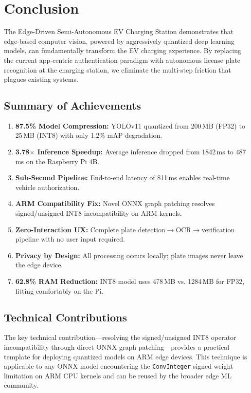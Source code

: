 \chapter{Conclusion}

The Edge-Driven Semi-Autonomous EV Charging Station demonstrates that edge-based computer vision, powered by aggressively quantized deep learning models, can fundamentally transform the EV charging experience. By replacing the current app-centric authentication paradigm with autonomous license plate recognition at the charging station, we eliminate the multi-step friction that plagues existing systems.

\section{Summary of Achievements}
\begin{enumerate}
    \item \textbf{87.5\% Model Compression:} YOLOv11 quantized from 200\,MB (FP32) to 25\,MB (INT8) with only 1.2\% mAP degradation.
    \item \textbf{3.78$\times$ Inference Speedup:} Average inference dropped from 1842\,ms to 487\,ms on the Raspberry Pi 4B.
    \item \textbf{Sub-Second Pipeline:} End-to-end latency of 811\,ms enables real-time vehicle authorization.
    \item \textbf{ARM Compatibility Fix:} Novel ONNX graph patching resolves signed/unsigned INT8 incompatibility on ARM kernels.
    \item \textbf{Zero-Interaction UX:} Complete plate detection$\to$OCR$\to$verification pipeline with no user input required.
    \item \textbf{Privacy by Design:} All processing occurs locally; plate images never leave the edge device.
    \item \textbf{62.8\% RAM Reduction:} INT8 model uses 478\,MB vs. 1284\,MB for FP32, fitting comfortably on the Pi.
\end{enumerate}

\section{Technical Contributions}
The key technical contribution---resolving the signed/unsigned INT8 operator incompatibility through direct ONNX graph patching---provides a practical template for deploying quantized models on ARM edge devices. This technique is applicable to any ONNX model encountering the \texttt{ConvInteger} signed weight limitation on ARM CPU kernels and can be reused by the broader edge ML community.

